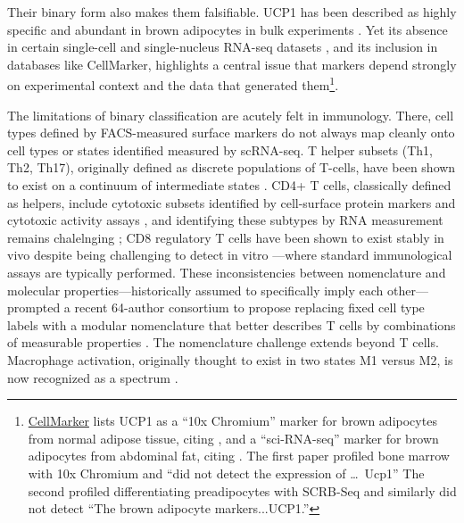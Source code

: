 \documentclass[10pt,twocolumn]{article}
\theoremstyle{plain}
\theoremstyle{definition}
\theoremstyle{remark}
\begin{document}
Their binary form also makes them falsifiable. UCP1 has been described as highly specific and abundant in brown adipocytes in bulk experiments \citep{Cypess_2013}. Yet its absence in certain single-cell and single-nucleus RNA-seq datasets \citep{Gupta_2022}, and its inclusion in databases like CellMarker, highlights a central issue that markers depend strongly on experimental context and the data that generated them\footnote{\href{http://www.bio-bigdata.center/CellMarkerDetail.jsp?species=Human&tissue_type=Adipose\%20tissue&tissue_class=Adipose\%20tissue&cell_name=Brown\%20adipocyte&cell_type=Normal\%20cell&marker=Ucp1&marker_source=Experiment&fourtable=four}{CellMarker} lists UCP1 as a ``10x Chromium'' marker for brown adipocytes from normal adipose tissue, citing \citep{Zhong2020bone}, and a ``sci-RNA-seq'' marker for brown adipocytes from abdominal fat, citing \citep{Ramirez_2020}. The first paper profiled bone marrow with 10x Chromium and ``did not detect the expression of \ldots\ Ucp1'' The second profiled differentiating preadipocytes with SCRB-Seq and similarly did not detect ``The brown adipocyte markers...UCP1.''}. 

The limitations of binary classification are acutely felt in immunology. There, cell types defined by FACS-measured surface markers do not always map cleanly onto cell types or states identified measured by scRNA-seq. T helper subsets (Th1, Th2, Th17), originally defined as discrete populations of T-cells, have been shown to exist on a continuum of intermediate states \citep{Murphy2010}. CD4+ T cells, classically defined as helpers, include cytotoxic subsets identified by cell-surface protein markers and cytotoxic activity assays \citep{Takeuchi2017}, and identifying these subtypes by RNA measurement remains chalelnging \citep{Ding_2020}; CD8 regulatory T cells have been shown to exist stably in vivo despite being challenging to detect in vitro \citep{Niederlova2021}---where standard immunological assays are typically performed. These inconsistencies between nomenclature and molecular properties---historically assumed to specifically imply each other---prompted a recent 64-author consortium to propose replacing fixed cell type labels with a modular nomenclature that better describes T cells by combinations of measurable properties \citep{Masopust2025, Comet2025}. The nomenclature challenge extends beyond T cells. Macrophage activation, originally thought to exist in two states M1 versus M2, is now recognized as a spectrum \citep{Murray2014}.
\end{document}
